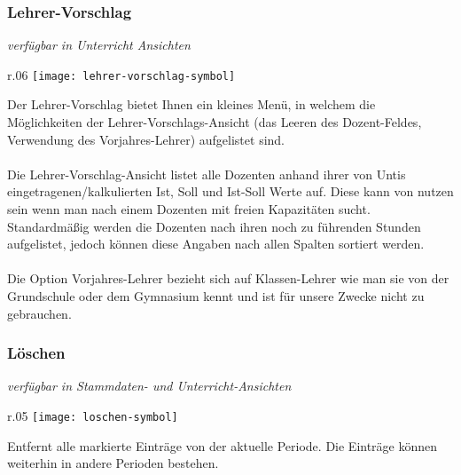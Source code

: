 \subsubsection{Lehrer-Vorschlag}
{\small\textit{verfügbar in Unterricht Ansichten\\}\par}

\begin{wrapfigure}{r}{.06\textwidth}
	\vspace{-50pt}
	\texttt{[image: lehrer-vorschlag-symbol]}
	\vspace{-35pt}
\end{wrapfigure}

\noindent
Der Lehrer-Vorschlag bietet Ihnen ein kleines Menü, in welchem die Möglichkeiten der Lehrer-Vorschlags-Ansicht (das Leeren des Dozent-Feldes, Verwendung des Vorjahres-Lehrer) aufgelistet sind.\\
\\
Die Lehrer-Vorschlag-Ansicht listet alle Dozenten anhand ihrer von Untis eingetragenen/kalkulierten Ist, Soll und Ist-Soll Werte auf. Diese kann von nutzen sein wenn man nach einem Dozenten mit freien Kapazitäten sucht. Standardmäßig werden die Dozenten nach ihren noch zu führenden Stunden aufgelistet, jedoch können diese Angaben nach allen Spalten sortiert werden.\\
\\
Die Option Vorjahres-Lehrer bezieht sich auf Klassen-Lehrer wie man sie von der Grundschule oder dem Gymnasium kennt und ist für unsere Zwecke nicht zu gebrauchen.\\

\subsubsection{Löschen}
{\small\textit{verfügbar in Stammdaten- und Unterricht-Ansichten\\}\par}

\begin{wrapfigure}{r}{.05\textwidth}
	\vspace{-50pt}
	\texttt{[image: loschen-symbol]}
	\vspace{-35pt}
\end{wrapfigure}

\noindent %
Entfernt alle markierte Einträge von der aktuelle Periode. Die Einträge können weiterhin in andere Perioden bestehen.


